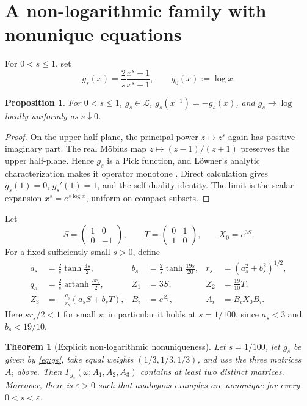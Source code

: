 \documentclass[11pt]{article}
\newcommand{\Gset}{\Gamma}
\newcommand{\artanh}{\operatorname{artanh}}
\newtheorem{theorem}{Theorem}
\newtheorem{proposition}{Proposition}
\begin{document}
\section{A non-logarithmic family with nonunique equations}

For \(0<s\le1\), set
\begin{equation}\label{eq:gs}
 g_s(x)=\frac{2}{s}\frac{x^s-1}{x^s+1},
 \qquad g_0(x):=\log x.
\end{equation}

\begin{proposition}\label{prop:gs}
For \(0<s\le1\), \(g_s\in\mathcal L\),
\(g_s(x^{-1})=-g_s(x)\), and \(g_s\to\log\) locally uniformly as
\(s\downarrow0\).
\end{proposition}

\begin{proof}
On the upper half-plane, the principal power \(z\mapsto z^s\) again has
positive imaginary part.  The real M\"obius map
\(z\mapsto(z-1)/(z+1)\) preserves the upper half-plane.  Hence \(g_s\) is a
Pick function, and L\"owner's analytic characterization makes it operator
monotone \cite[Chapter V]{Bhatia}.  Direct calculation gives
\(g_s(1)=0\), \(g_s'(1)=1\), and the self-duality identity.  The limit is
the scalar expansion \(x^s=e^{s\log x}\), uniform on compact subsets.
\end{proof}

Let
\[
 S=\begin{pmatrix}1&0\\0&-1\end{pmatrix},\qquad
 T=\begin{pmatrix}0&1\\1&0\end{pmatrix},\qquad X_0=e^{3S}.
\]
For a fixed sufficiently small \(s>0\), define
\begin{align*}
 a_s&=\frac2s\tanh\frac{3s}{2},
 &b_s&=\frac2s\tanh\frac{19s}{20},
 &r_s&=(a_s^2+b_s^2)^{1/2},\\
 q_s&=\frac2s\artanh\frac{s r_s}{2},
 &Z_1&=3S,
 &Z_2&=\frac{19}{10}T,\\
 Z_3&=-\frac{q_s}{r_s}(a_sS+b_sT),
 &B_i&=e^{Z_i},
 &A_i&=B_iX_0B_i.
\end{align*}
Here \(sr_s/2<1\) for small \(s\); in particular it holds at
\(s=1/100\), since \(a_s<3\) and \(b_s<19/10\).

\begin{theorem}[Explicit non-logarithmic nonuniqueness]\label{thm:nonunique}
Let \(s=1/100\), let \(g_s\) be given by \eqref{eq:gs}, take equal weights
\((1/3,1/3,1/3)\), and use the three matrices \(A_i\) above.  Then
\(\Gset_{g_s}(\omega;A_1,A_2,A_3)\) contains at least two distinct matrices.
Moreover, there is \(\varepsilon>0\) such that analogous examples are
nonunique for every \(0<s<\varepsilon\).
\end{theorem}
\end{document}
